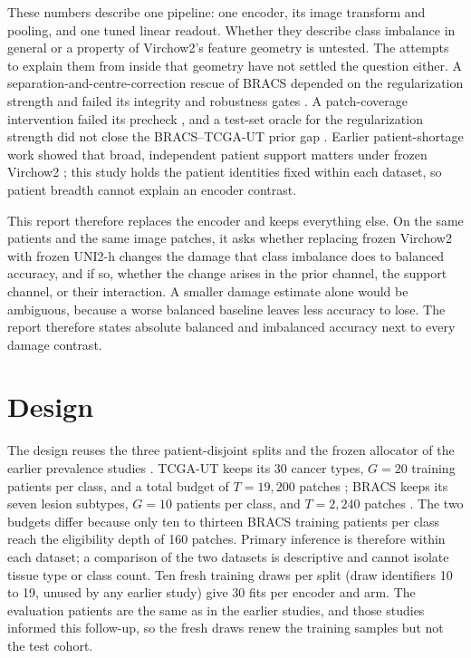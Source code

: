 \documentclass[11pt]{article}
\begin{document}
These numbers describe one pipeline: one encoder, its image transform and pooling, and one tuned linear readout. Whether they describe class imbalance in general or a property of Virchow2's feature geometry is untested. The attempts to explain them from inside that geometry have not settled the question either. A separation-and-centre-correction rescue of BRACS depended on the regularization strength and failed its integrity and robustness gates \citep{queisler2026jointMechanism}. A patch-coverage intervention failed its precheck \citep{queisler2026supportCoverage}, and a test-set oracle for the regularization strength did not close the BRACS--TCGA-UT prior gap \citep{queisler2026lambdaSelection}. Earlier patient-shortage work showed that broad, independent patient support matters under frozen Virchow2 \citep{queisler2026patientShortage}; this study holds the patient identities fixed within each dataset, so patient breadth cannot explain an encoder contrast.

This report therefore replaces the encoder and keeps everything else. On the same patients and the same image patches, it asks whether replacing frozen Virchow2 with frozen UNI2-h \citep{mahmoodlab2025uni2h} changes the damage that class imbalance does to balanced accuracy, and if so, whether the change arises in the prior channel, the support channel, or their interaction. A smaller damage estimate alone would be ambiguous, because a worse balanced baseline leaves less accuracy to lose. The report therefore states absolute balanced and imbalanced accuracy next to every damage contrast.

\section{Design}
\label{sec:design}
The design reuses the three patient-disjoint splits and the frozen allocator of the earlier prevalence studies \citep{queisler2026prevalenceTcga, queisler2026prevalenceBracs}. TCGA-UT keeps its 30 cancer types, $G=20$ training patients per class, and a total budget of $T=19{,}200$ patches \citep{komura2022universalEncoding}; BRACS keeps its seven lesion subtypes, $G=10$ patients per class, and $T=2{,}240$ patches \citep{brancati2022bracs}. The two budgets differ because only ten to thirteen BRACS training patients per class reach the eligibility depth of 160 patches. Primary inference is therefore within each dataset; a comparison of the two datasets is descriptive and cannot isolate tissue type or class count. Ten fresh training draws per split (draw identifiers 10 to 19, unused by any earlier study) give 30 fits per encoder and arm. The evaluation patients are the same as in the earlier studies, and those studies informed this follow-up, so the fresh draws renew the training samples but not the test cohort.
\end{document}
